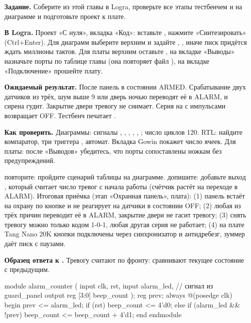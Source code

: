 \begin{diybox}
\textbf{Задание.} Соберите  из этой главы в Logra, проверьте все этапы тестбенчем и на диаграмме и подготовьте проект к плате.

\textbf{В Logra.} Проект «С нуля», вкладка «Код»: вставьте , нажмите «Синтезировать» (Ctrl+Enter). Для диаграмм выберите верхним  и задайте , , иначе писк придётся ждать миллионы тактов. Для платы верхним оставьте , на вкладке «Выводы» назначьте порты по таблице главы (она повторяет файл ), на вкладке «Подключение» прошейте плату.

\textbf{Ожидаемый результат.} После  панель в состоянии ARMED. Срабатывание двух датчиков из трёх, шум выше 9 или дверь ночью переводят её в ALARM, и сирена гудит. Закрытие двери тревогу не снимает. Серия  на  с импульсами  возвращает OFF. Тестбенч печатает .

\textbf{Как проверить.} Диаграммы: сигналы , , , , , ; число циклов 120. RTL: найдите компаратор, три триггера , автомат. Вкладка Gowin покажет число ячеек. Для платы: после «Выводов» убедитесь, что порты  сопоставлены ножкам без предупреждений.

 повторите: пройдите сценарий таблицы на диаграмме.  допишите: добавьте выход , который считает число тревог с начала работы (счётчик растёт на переходе в ALARM).  Итоговая приёмка (этап «Охранная панель», плата): (1) панель встаёт на охрану по кнопке и не реагирует на датчики в состоянии OFF; (2) любая из трёх причин переводит её в ALARM, закрытие двери не гасит тревогу; (3) снять тревогу можно только кодом 1-0-1, любая другая серия не работает; (4) на плате Tang Nano 20K кнопки подключены через синхронизатор и антидребезг, зуммер даёт писк с паузами.
\end{diybox}

\textbf{Образец ответа к .} Тревогу считают по фронту: сравнивают текущее состояние с предыдущим.
\begin{vcode}
module alarm_counter (
    input        clk, rst,
    input        alarm_led,        // сигнал из guard_panel
    output reg [3:0] beep_count
);
    reg prev;
    always @(posedge clk) begin
        prev <= alarm_led;
        if (rst) beep_count <= 4'd0;
        else if (alarm_led && !prev) beep_count <= beep_count + 4'd1;
    end
endmodule
\end{vcode}


